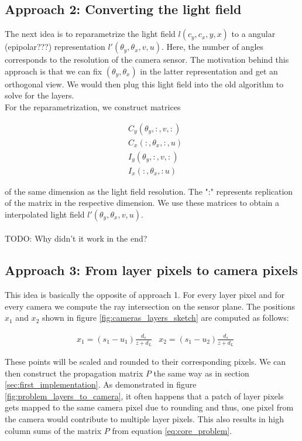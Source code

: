 \documentclass[11pt,a4paper,titlepage]{article}
\begin{document}
\subsection{Approach 2: Converting the light field}
The next idea is to reparametrize the light field $l \left( c_y, c_x, y, x \right)$ to a angular (epipolar???) representation $l' \left( \theta_y, \theta_x, v, u \right)$. Here, the number of angles corresponds to the resolution of the camera sensor. The motivation behind this approach is that we can fix 
$\left( \theta_y, \theta_x \right)$ in the latter representation and get an orthogonal view. We would then plug this light field into the old algorithm to solve for the layers.
\\
For the reparametrization, we construct matrices

\begin{align*}
	& C_y \left( \theta_y, :, v, : \right) \\
	& C_x \left( :, \theta_x, :, u \right) \\
	& I_y \left(\theta_y, :, v, : \right) \\
	& I_x \left( :, \theta_x, : u \right) 
\end{align*}

of the same dimension as the light field resolution. The ":" represents replication of the matrix in the respective dimension. We use these matrices to obtain a interpolated light field $l' \left( \theta_y, \theta_x, v, u \right)$.
\\\\ TODO: Why didn't it work in the end? 

\subsection{Approach 3: From layer pixels to camera pixels}
This idea is basically the opposite of approach 1. For every layer pixel and for every camera we compute the ray intersection on the sensor plane. The positions $x_1$ and $x_2$ shown in figure \ref{fig:cameras_layers_sketch} are computed as follows:

\begin{align*}
	& x_1 = \left( s_1 - u_1 \right) \frac{d_s}{z + d_L} & x_2 = \left( s_1 - u_2 \right) \frac{d_s}{z + d_L}
\end{align*}

These points will be scaled and rounded to their corresponding pixels. We can then construct the propagation matrix $P$ the same way as in section \ref{sec:first_implementation}.
As demonstrated in figure \ref{fig:problem_layers_to_camera}, it often happens that a patch of layer pixels gets mapped to the same camera pixel due to rounding and thus, one pixel from the camera would contribute to multiple layer pixels. This also results in high column sums of the matrix $P$ from equation \ref{eq:core_problem}.
\end{document}
